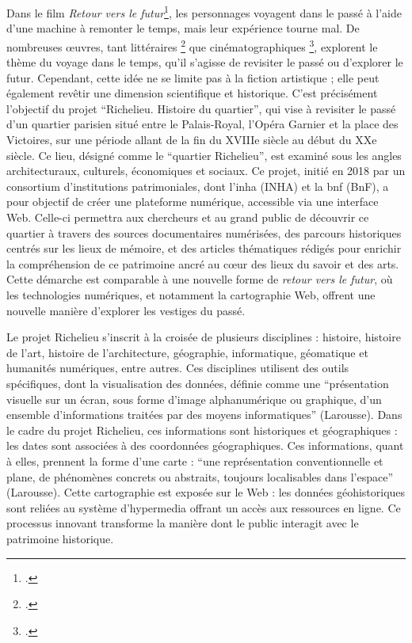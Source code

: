 Dans le film \textit{Retour vers le futur}\footcite{ZEMECKISRetour1985}, les personnages voyagent dans le passé à l'aide d'une machine à remonter le temps, mais leur expérience tourne mal. De nombreuses œuvres, tant littéraires \footcite{BARJAVELVoyageur1943, ASIMOVFin1955, BAXTERVaisseaux1996, WELLSmachine1895} que cinématographiques \footcite{MARKERJetee1962, PALMachine1960, DIVERSDoctor1963, POIREVisiteurs1993, CURTIStime2013, NOLANTenet2020}, explorent le thème du voyage dans le temps, qu'il s'agisse de revisiter le passé ou d'explorer le futur. Cependant, cette idée ne se limite pas à la fiction artistique ; elle peut également revêtir une dimension scientifique et historique. C'est précisément l'objectif du projet \enquote{Richelieu. Histoire du quartier}, qui vise à revisiter le passé d'un quartier parisien situé entre le Palais-Royal, l'Opéra Garnier et la place des Victoires, sur une période allant de la fin du XVIIIe siècle au début du XXe siècle. Ce lieu, désigné comme le \enquote{quartier Richelieu}, est examiné sous les angles architecturaux, culturels, économiques et sociaux. Ce projet, initié en 2018 par un consortium d'institutions patrimoniales, dont l'\acrlong{inha} (INHA) et la \acrlong{bnf} (BnF), a pour objectif de créer une plateforme numérique, accessible via une interface Web. Celle-ci permettra aux chercheurs et au grand public de découvrir ce quartier à travers des sources documentaires numérisées, des parcours historiques centrés sur les lieux de mémoire, et des articles thématiques rédigés pour enrichir la compréhension de ce patrimoine ancré au cœur des lieux du savoir et des arts. Cette démarche est comparable à une nouvelle forme de \textit{retour vers le futur}, où les technologies numériques, et notamment la cartographie Web, offrent une nouvelle manière d'explorer les vestiges du passé.

Le projet Richelieu s'inscrit à la croisée de plusieurs disciplines : histoire, histoire de l'art, histoire de l'architecture, géographie, informatique, géomatique et humanités numériques, entre autres. Ces disciplines utilisent des outils spécifiques, dont la visualisation des données, définie comme une \enquote{présentation visuelle sur un écran, sous forme d'image alphanumérique ou graphique, d'un ensemble d'informations traitées par des moyens informatiques} (Larousse). Dans le cadre du projet Richelieu, ces informations sont historiques et géographiques : les dates sont associées à des coordonnées géographiques. Ces informations, quant à elles, prennent la forme d'une carte : \enquote{une représentation conventionnelle et plane, de phénomènes concrets ou abstraits, toujours localisables dans l'espace} (Larousse). Cette cartographie est exposée sur le Web : les données géohistoriques sont reliées au système d'hypermedia offrant un accès aux ressources en ligne. Ce processus innovant transforme la manière dont le public interagit avec le patrimoine historique.

